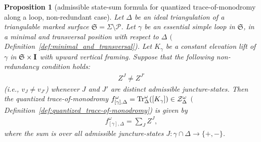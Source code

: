 \documentclass[10pt,a4paper]{amsart}
\numberwithin{equation}{section}
\newtheorem{Proposition}[Theorem]{Proposition}
\theoremstyle{definition}
\begin{document}
\begin{Proposition}[admissible state-sum formula for quantized trace-of-monodromy along a loop, non-redundant case]
\label{prop:BW_admissible_sum_formula}
Let $\Delta$ be an ideal triangulation of a triangulable marked surface $\mathfrak{S} = \Sigma\setminus\mathcal{P}$. Let $\gamma$ be an essential simple loop in $\mathfrak{S}$, in a minimal and transversal position with respect to $\Delta$ $($Definition~{\rm \ref{def:minimal_and_transversal})}. Let $K_\gamma$ be a constant elevation lift of $\gamma$ in $\mathfrak{S} \times {\bf I}$ with upward vertical framing. Suppose that the following {\em non-redundancy} condition holds:
\begin{align}
\label{eq:admissible_non-redundancy_condition}
Z^J \neq Z^{J'}
\end{align}
(i.e., $v_J\neq v_{J'}$) whenever $J$ and $J'$ are distinct admissible juncture-states.
Then the quantized trace-of-monodromy $f^\omega_{[\gamma],\Delta} = {\rm Tr}^\omega_\Delta([K_\gamma]) \in \mathcal{Z}^\omega_\Delta$ $($Definition~{\rm \ref{def:quantized_trace-of-monodromy})} is given by
\begin{align}
\label{eq:admissible_sum_formula}
f^\omega_{[\gamma],\Delta}
= \sum_J Z^J,
\end{align}
where the sum is over all admissible juncture-states $J \colon \gamma\cap \Delta \to \{+,-\}$.
\end{Proposition}
\end{document}
